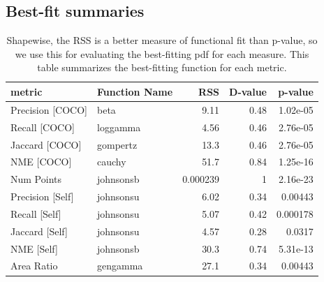 \documentclass[12pt]{article}
\begin{document}
\newpage
\begin{appendices}
\section{Best-fit summaries}
\begin{table}[ht]
\centering
\begin{tabular}{llrrr}
\hline
 metric           & Function Name   &       RSS &   D-value &   p-value \\
\hline
 Precision [COCO] & beta            &  9.11     &      0.48 &  1.02e-05 \\
 Recall [COCO]    & loggamma        &  4.56     &      0.46 &  2.76e-05 \\
 Jaccard [COCO]   & gompertz        & 13.3      &      0.46 &  2.76e-05 \\
 NME [COCO]       & cauchy          & 51.7      &      0.84 &  1.25e-16 \\
 Num Points       & johnsonsb       &  0.000239 &      1    &  2.16e-23 \\
 Precision [Self] & johnsonsu       &  6.02     &      0.34 &  0.00443  \\
 Recall [Self]    & johnsonsu       &  5.07     &      0.42 &  0.000178 \\
 Jaccard [Self]   & johnsonsu       &  4.57     &      0.28 &  0.0317   \\
 NME [Self]       & johnsonsb       & 30.3      &      0.74 &  5.31e-13 \\
 Area Ratio       & gengamma        & 27.1      &      0.34 &  0.00443  \\
\hline
\end{tabular}
\caption{Shapewise, the RSS is a better measure of functional fit than p-value, so we use this for evaluating the best-fitting pdf for each measure. This table summarizes the best-fitting function for each metric.}
\label{overall_best_fits}
\end{table}


\end{appendices}
\end{document}
